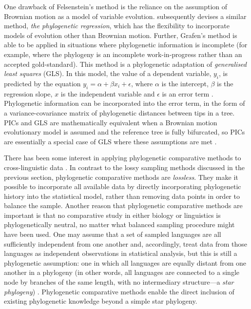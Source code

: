 One drawback of Felsenstein's method is the reliance on the assumption of Brownian motion as a model of variable evolution. \textcite{grafen_phylogenetic_1989} subsequently devises a similar method, \emph{the phylogenetic regression}, which has the flexibility to incorporate models of evolution other than Brownian motion. Further, Grafen's method is able to be applied in situations where phylogenetic information is incomplete (for example, where the phylogeny is an incomplete work-in-progress rather than an accepted gold-standard). This method is a phylogenetic adaptation of \emph{generalised least squares} (GLS). In this model, the value of a dependent variable, \(y_{i}\), is predicted by the equation \(y_{i} = \alpha + \beta x_{i} + \epsilon\), where \(\alpha\) is the intercept, \(\beta\) is the regression slope, \(x\) is the independent variable and \(\epsilon\) is an error term \autocite[p.~164]{nunn_comparative_2011}. Phylogenetic information can be incorporated into the error term, in the form of a variance-covariance matrix of phylogenetic distances between tips in a tree. PICs and GLS are mathematically equivalent when a Brownian motion evolutionary model is assumed and the reference tree is fully bifurcated, so PICs are essentially a special case of GLS where these assumptions are met \autocite{nunn_comparative_2011}.

There has been some interest in applying phylogenetic comparative methods to cross-linguistic data \autocites[for example,][]{dunn_evolved_2011}{maurits_tracing_2014}{verkerk_diachronic_2014}{birchall_comparison_2015}{zhou_quantifying_2015}{calude_typology_2016}{dunn_dative_2017}{verkerk_phylogenetic_2017}{bentz_evolution_2018}. In contrast to the lossy sampling methods discussed in the previous section, phylogenetic comparative methods are \emph{lossless}. They make it possible to incorporate all available data by directly incorporating phylogenetic history into the statistical model, rather than removing data points in order to balance the sample. Another reason that phylogenetic comparative methods are important is that no comparative study in either biology or linguistics is phylogenetically neutral, no matter what balanced sampling procedure might have been used. One may assume that a set of sampled languages are all sufficiently independent from one another and, accordingly, treat data from those languages as independent observations in statistical analysis, but this is still a phylogenetic assumption: one in which all languages are equally distant from one another in a phylogeny (in other words, all languages are connected to a single node by branches of the same length, with no intermediary structure---a \emph{star phylogeny}) \autocite{purvis_polytomies_1993}. Phylogenetic comparative methods enable the direct inclusion of existing phylogenetic knowledge beyond a simple star phylogeny.

